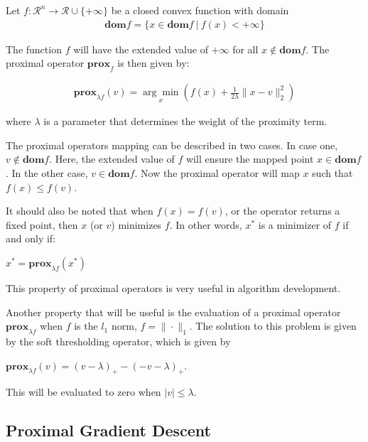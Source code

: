 \documentclass[10pt]{article} %
\begin{document}
Let $ {f} : \mathcal{R}^n \xrightarrow{} \mathcal{R} \cup \{ + \infty \}$ be a closed convex function with domain 
\begin{align*}
    \mathbf{dom}{f} = \{ x \in \mathbf{dom}{f}  \ | \  {f}(x) < + \infty \}
\end{align*}

The function $f$ will have the extended value of $+ \infty$ for all $x \notin \mathbf{dom} f$. The proximal operator $\mathbf{prox}_f$ is then given by:

\begin{align*}    
\mathbf{prox}_{\lambda f} (v) = \underset{x}{\arg\min} (f(x) + \frac{1}{2 \lambda} \| x - v \|_2^2)
\end{align*}

\noindent where $\lambda$ is a parameter that determines the weight of the proximity term.

The proximal operators mapping can be described in two cases. In case one, $v \notin \mathbf{dom} f$. Here, the extended value of $f$ will ensure the mapped point $x \in \mathbf{dom}{f}$. In the other case, $v \in \mathbf{dom}{f}$. Now the proximal operator will map $x$ such that $f(x) \leq f(v)$. 

It should also be noted that when $f(x) = f(v)$, or the operator returns a fixed point, then $x$ (or $v$) minimizes $f$. In other words, $x^*$ is a minimizer of $f$ if and only if: 

\begin{center}
    $x^* = \mathbf{prox}_{\lambda f} (x^*)$
\end{center}

\noindent This property of proximal operators is very useful in algorithm development. 

Another property that will be useful is the evaluation of a proximal operator $\mathbf{prox}_{\lambda f}$ when $f$ is the ${l}_1$ norm, $f = \| \cdot \|_1$. The solution to this problem is given by the soft thresholding operator, which is given by

\begin{center}
    $\mathbf{prox}_{\lambda f} (v) = (v-\lambda)_+ - (-v-\lambda)_+$.
\end{center}

\noindent This will be evaluated to zero when $|v| \leq \lambda$.
\vspace{\baselineskip}


\subsection{Proximal Gradient Descent}
\end{document}
